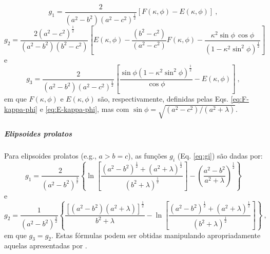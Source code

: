 \begin{equation}
g_{1} = \frac{2}{\left( a^{2} - b^{2} \right) \left( a^{2} - c^{2} \right)^{\frac{1}{2}}}
\left[ F(\kappa, \phi) - E(\kappa, \phi) \right] \: ,
\label{eq:g1-triaxial}
\end{equation}
\begin{equation}
g_{2} = \frac{2 \left( a^{2} - c^{2} \right)^{\frac{1}{2}}}
{\left( a^{2} - b^{2} \right)\left( b^{2} - c^{2} \right)}
\left[ E\left(\kappa, \phi \right) 
- \frac{\left( b^{2} - c^{2} \right)}{\left( a^{2} - c^{2} \right)}
F\left(\kappa, \phi \right) 
- \frac{\kappa^{2} \sin\phi \, \cos\phi}
{\left( 1 - \kappa^{2} \sin^{2}\phi \right)^{\frac{1}{2}}}
\right]
\label{eq:g2-triaxial}
\end{equation}
e
\begin{equation}
g_{3} = \frac{2}{\left( a^{2} - b^{2} \right) \left( a^{2} - c^{2} \right)^{\frac{1}{2}}}
\left[ \frac{\sin\phi \left( 1 - \kappa^{2} \sin^{2}\phi \right)^{\frac{1}{2}}}
{\cos\phi}  - E\left(\kappa, \phi \right) \right]
\: ,
\label{eq:g3-triaxial}
\end{equation}
em que $F(\kappa, \phi)$ e $E(\kappa, \phi)$ são, respectivamente, definidas pelas
Eqs. \ref{eq:F-kappa-phi} e \ref{eq:E-kappa-phi},
mas com
$\sin \phi = \sqrt{\left( a^{2} - c^{2} \right)/\left( a^{2} + \lambda \right)}$.

\subparagraph*{Elipsoides prolatos}


Para elipsoides prolatos (e.g., $a > b = c$), as funções
$g_{i}$ (Eq. \ref{eq:gi}) são dadas por:
\begin{equation}
g_{1} =  \frac{2}{\left( a^{2} - b^{2} \right)^{\frac{3}{2}}}
\left\lbrace
\ln \left[ \frac{\left( a^{2} - b^{2} \right)^{\frac{1}{2}} + 
	\left( a^{2} + \lambda \right)^{\frac{1}{2}}}{
	\left( b^{2} + \lambda \right)^{\frac{1}{2}}} \right] -
\left( \frac{a^{2} - b^{2}}{a^{2} + \lambda} \right)^{\frac{1}{2}}
\right\rbrace
\label{eq:g1-prolate}
\end{equation}
e
\begin{equation}
g_{2} =  \frac{1}{\left( a^{2} - b^{2} \right)^{\frac{3}{2}}}
\left\lbrace
\frac{\left[ \left( a^{2} - b^{2} \right)
	\left( a^{2} + \lambda \right) \right]^{\frac{1}{2}}}
{b^{2} + \lambda} -
\ln \left[ \frac{\left( a^{2} - b^{2} \right)^{\frac{1}{2}} + 
	\left( a^{2} + \lambda \right)^{\frac{1}{2}}}{
	\left( b^{2} + \lambda \right)^{\frac{1}{2}}} \right]
\right\rbrace \: ,
\label{eq:g2-prolate}
\end{equation}
em que $g_{3} = g_{2}$.
Estas fórmulas podem ser obtidas manipulando apropriadamente aquelas
apresentadas por \cite{emerson1985}.


